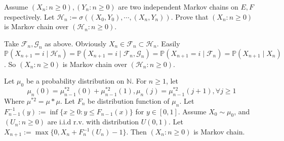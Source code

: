 \documentclass{ctexart}
\begin{document}
\begin{problem}\label{pro:5}
  Assume \((X_n:n \geq 0),(Y_n:n \geq 0)\) are two independent Markov chains on \(E,F\) respectively.
  Let \(\mathcal{H}_n:=\sigma((X_0,Y_0),\cdots,(X_n,Y_n))\).
  Prove that \((X_n:n \geq 0)\) is Markov chain over \((\mathcal{H}_n:n \geq 0)\).
\end{problem}
\begin{solution}
  Take \(\mathcal{F}_n,\mathcal{G}_n\) as above.
  Obviously \(X_n \in \mathcal{F}_n \subset \mathcal{H}_n\).
  Easily \(\mathbb{P}(X_{n+1}=i \mid \mathcal{H}_n)=\mathbb{P}(X_{n+1} =i \mid \mathcal{F}_n,\mathcal{G}_n)=\mathbb{P}(X_{n+1} =i \mid \mathcal{F}_n)=\mathbb{P}(X_{n+1} \mid X_n)\).
  So \((X_n:n \geq 0)\) is Markov chain over \((\mathcal{H}_n:n \geq 0)\).
\end{solution}
\begin{problem}\label{pro:6}
  Let \(\mu_0\) be a probability distribution on \(\mathbb{N}\).
  For \(n \geq 1\), let
  \[
    \mu_n(0)=\mu^{*2}_{n-1} (0)+\mu^{*2}_{n-1} (1),\mu_n(j)=\mu^{*2}_{n-1} (j+1),\forall j \geq 1
  \]
  Where \(\mu^{*2}=\mu*\mu\).
  Let \(F_n\) be distribution function of \(\mu_n\).
  Let \(F^{-1}_{n-1} (y):=\inf \{x \geq 0:y \leq F_{n-1} (x)\}\) for \(y \in [0,1]\).
  Assume \(X_0 \sim \mu_0\), and \((U_n:n \geq 0)\) are i.i.d r.v. with distribution \(U(0,1)\).
  Let \(X_{n+1} :=\max\{0,X_n +F^{-1}_n (U_n)-1\}\).
  Then \((X_n:n \geq 0)\) is Markov chain.
\end{problem}
\end{document}
